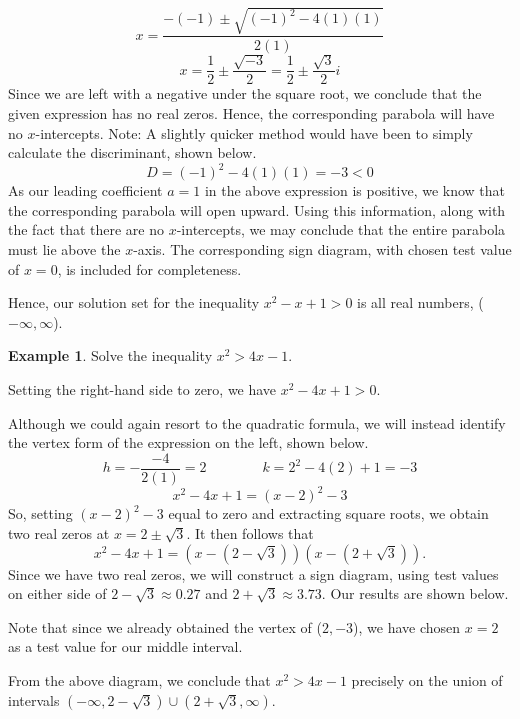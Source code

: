 \documentclass[12pt]{book}
\theoremstyle{definition}
\newtheorem{example}{Example}
\begin{document}
$$x=\frac{-(-1)\pm\sqrt{(-1)^2-4(1)(1)}}{2(1)}$$
$$x=\frac{1}{2}\pm\frac{\sqrt{-3}}{2}=\frac{1}{2}\pm\frac{\sqrt{3}}{2}i$$
Since we are left with a negative under the square root, we conclude that the given expression has no real zeros.  Hence, the corresponding parabola will have no $x$-intercepts.  Note: A slightly quicker method would have been to simply calculate the discriminant, shown below.
$$D=(-1)^2-4(1)(1)=-3<0$$
As our leading coefficient $a=1$ in the above expression is positive, we know that the corresponding parabola will open upward.  Using this information, along with the fact that there are no $x$-intercepts, we may conclude that the entire parabola must lie above the $x$-axis.  The corresponding sign diagram, with chosen test value of $x=0$, is included for completeness.
\begin{center}
\end{center} 
Hence, our solution set for the inequality $x^2-x+1>0$ is all real numbers, ($-\infty,\infty$).
\begin{example}
Solve the inequality $x^2>4x-1$.
\end{example}
Setting the right-hand side to zero, we have $x^2-4x+1>0.$\par
Although we could again resort to the quadratic formula, we will instead identify the vertex form of the expression on the left, shown below.
$$h=-\frac{-4}{2(1)}=2\qquad\qquad k=2^2-4(2)+1=-3$$
$$x^2-4x+1=(x-2)^2-3$$
So, setting $(x-2)^2-3$ equal to zero and extracting square roots, we obtain two real zeros at $x=2\pm\sqrt{3}$.  It then follows that
$$x^2-4x+1=\left(x-(2-\sqrt{3})\right)\left(x-(2+\sqrt{3})\right).$$
Since we have two real zeros, we will construct a sign diagram, using test values on either side of $2-\sqrt{3}\approx 0.27$ and $2+\sqrt{3}\approx 3.73$.  Our results are shown below.
\begin{center}
\end{center} 
Note that since we already obtained the vertex of ($2,-3$), we have chosen $x=2$ as a test value for our middle interval.\par
From the above diagram, we conclude that $x^2>4x-1$ precisely on the union of intervals $(-\infty,2-\sqrt{3})\cup(2+\sqrt{3},\infty)$.
\newpage
\end{document}
